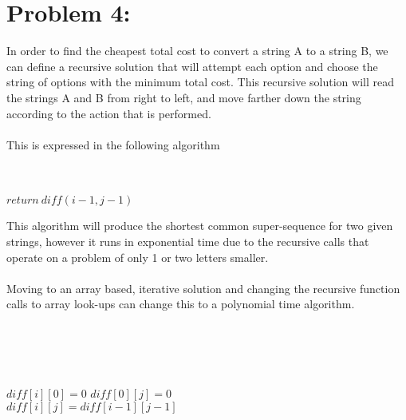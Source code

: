 \documentclass[12pt]{article}
\begin{document}
\section*{Problem 4: }
In order to find the cheapest total cost to convert a string A to a string B, we can define a recursive solution that will attempt each option and choose the string of options with the minimum total cost. This recursive solution will read the strings A and B from right to left, and move farther down the string according to the action that is performed.\\\\
This is expressed in the following algorithm\\\\
\begin{algorithm}[H]
\\
{$return\ \mathit{diff}(i - 1, j - 1)$}
\end{algorithm}
This algorithm will produce the shortest common super-sequence for two given strings, however it runs in exponential time due to the recursive calls that operate on a problem of only 1 or two letters smaller.\\\\
Moving to an array based, iterative solution and changing the recursive function calls to array look-ups can change this to a polynomial time algorithm.\\\\

\begin{algorithm}[H]
\\
\Init\\
\\
{$\mathit{diff}[i][0] = 0$}
{$\mathit{diff}[0][j] = 0$}
\Calc\\
{
{
{$\mathit{diff}[i][j] = \mathit{diff}[i - 1][j - 1]$}
}
}
\end{algorithm}
\end{document}
